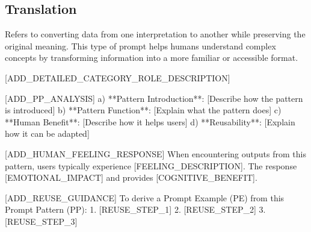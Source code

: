 
\subsection{Translation}
\label{subsec:Translation}
Refers to converting data from one interpretation to another while preserving the original meaning. This type of prompt helps humans understand complex concepts by transforming information into a more familiar or accessible format.

[ADD_DETAILED_CATEGORY_ROLE_DESCRIPTION]

[ADD_PP_ANALYSIS]
a) **Pattern Introduction**: [Describe how the pattern is introduced]
b) **Pattern Function**: [Explain what the pattern does]
c) **Human Benefit**: [Describe how it helps users]
d) **Reusability**: [Explain how it can be adapted]

[ADD_HUMAN_FEELING_RESPONSE]
When encountering outputs from this pattern, users typically experience [FEELING_DESCRIPTION]. 
The response [EMOTIONAL_IMPACT] and provides [COGNITIVE_BENEFIT].

[ADD_REUSE_GUIDANCE]
To derive a Prompt Example (PE) from this Prompt Pattern (PP):
1. [REUSE_STEP_1]
2. [REUSE_STEP_2] 
3. [REUSE_STEP_3]


